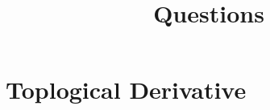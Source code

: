 \documentclass{report}
\title{Questions}
\begin{document}
%

%
\chapter{Toplogical Derivative}

%
\end{document}
